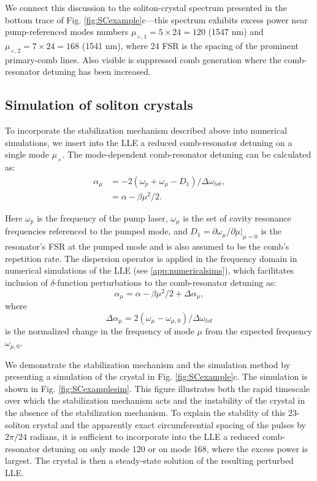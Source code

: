 We connect this discussion to the soliton-crystal spectrum presented in the bottom trace of Fig. \ref{fig:SCexample}c---this spectrum exhibits excess power near pump-referenced modes numbers $\mu_{\times,1}=5\times24=120$ (1547 nm) and $\mu_{\times,2}=7\times24=168$  (1541 nm), where 24 FSR is the spacing of the prominent primary-comb lines. Also visible is suppressed comb generation where the comb-resonator detuning has been increased. 

\subsection{Simulation of soliton crystals}

To incorporate the stabilization mechanism described above into numerical simulations, we insert into the LLE a reduced comb-resonator detuning on a single mode $\mu_\times$. The mode-dependent comb-resonator detuning can be calculated as:
\begin{align}
\alpha_\mu&=-2(\omega_p+\omega_\mu-D_1)/\Delta\omega_{tot},\\
&=\alpha-\beta\mu^2/2.
\end{align}

Here $\omega_p$ is the frequency of the pump laser, $\omega_\mu$ is the set of cavity resonance frequencies referenced to the pumped mode, and $D_1=\partial\omega_\mu/\partial\mu|_{\mu=0}$ is the resonator's FSR at the pumped mode and is also assumed to be the comb's repetition rate. The dispersion operator is applied in the frequency domain in numerical simulations of the LLE (see \ref{app:numericalsims}), which facilitates inclusion of $\delta$-function perturbations to the comb-resonator detuning as:
\begin{equation}
\alpha_\mu=\alpha-\beta\mu^2/2+\Delta\alpha_\mu,
\end{equation}
where
\begin{equation}
\Delta\alpha_\mu=2(\omega_\mu-\omega_{\mu,0})/\Delta\omega_{tot}
\end{equation}
is the normalized change in the frequency of mode $\mu$ from the expected frequency $\omega_{\mu,0}$. 

We demonstrate the stabilization mechanism and the simulation method by presenting a simulation of the crystal in Fig. \ref{fig:SCexample}c. The simulation is shown in Fig. \ref{fig:SCexamplesim}. This figure illustrates both the rapid timescale over which the stabilization mechanism acts and the instability of the crystal in the absence of the stabilization mechanism. To explain the stability of this 23-soliton crystal and the apparently exact circumferential spacing of the pulses by $2\pi/24$ radians, it is sufficient to incorporate into the LLE a reduced comb-resonator detuning on only mode 120 or on mode 168, where the excess power is largest. The crystal is then a steady-state solution of the resulting perturbed LLE.

